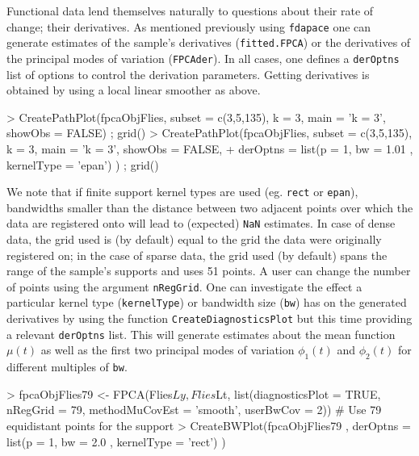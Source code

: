 \documentclass[11pt,english]{article}
\begin{document}
Functional data lend themselves naturally to questions about their rate of change; their derivatives. As mentioned previously using \texttt{fdapace} one can generate estimates of the sample's derivatives (\texttt{fitted.FPCA}) or the derivatives of the principal modes of variation (\texttt{FPCAder}). In all cases, one defines a \texttt{derOptns} list of options to control the derivation parameters. Getting derivatives is obtained by using a local linear smoother as above. 
\begin{Schunk}
\begin{Sinput}
>   CreatePathPlot(fpcaObjFlies, subset = c(3,5,135), k = 3, main = 'k = 3', showObs = FALSE) ; grid() 
>   CreatePathPlot(fpcaObjFlies, subset = c(3,5,135), k = 3, main = 'k = 3', showObs = FALSE, 
+                  derOptns = list(p = 1, bw = 1.01 , kernelType = 'epan') ) ; grid() 
\end{Sinput}
\end{Schunk}

We note that if finite support kernel types are used (eg. \texttt{rect} or \texttt{epan}), bandwidths smaller than the distance between two adjacent points over which the data are registered onto will lead to (expected) \texttt{NaN} estimates. In case of dense data, the grid used is (by default) equal to the grid the data were originally registered on; in the case of sparse data, the grid used (by default) spans the range of the sample's supports and uses 51 points. A user can change the number of points using the argument \texttt{nRegGrid}.  
One can investigate the effect a particular kernel type (\texttt{kernelType}) or bandwidth size (\texttt{bw}) has on the generated derivatives by using the function \texttt{CreateDiagnosticsPlot} but this time providing a relevant \texttt{derOptns} list. This will generate estimates about the mean function $\mu(t)$ as well as the first two principal modes of variation $\phi_1(t)$ and $\phi_2(t)$ for different multiples of \texttt{bw}. 

\begin{Schunk}
\begin{Sinput}
> fpcaObjFlies79 <- FPCA(Flies$Ly, Flies$Lt, list(diagnosticsPlot = TRUE, nRegGrid = 79, methodMuCovEst = 'smooth', userBwCov = 2)) # Use 79 equidistant points for the support
> CreateBWPlot(fpcaObjFlies79 , derOptns = list(p = 1, bw = 2.0 , kernelType = 'rect') )
\end{Sinput}
\end{Schunk}



%
\end{document}
